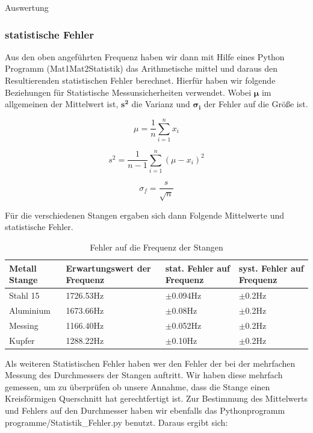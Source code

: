 \documentclass[twoside]{protokoll}
\begin{document}
\begin{aufgabe}{Auswertung}
\subsubsection{statistische Fehler} 

Aus den oben angeführten Frequenz haben wir dann mit Hilfe eines Python Programm (Mat1Mat2Statistik) das Arithmetische mittel und daraus den Resultierenden statistischen Fehler berechnet. Hierfür haben wir folgende Beziehungen für Statistische Messunsicherheiten verwendet. Wobei $\pmb{\mu}$ im allgemeinen der Mittelwert ist, $\mathbf{s^2}$ die Varianz und $\pmb{\sigma_i}$ der Fehler auf die Größe ist.

\begin{equation}
	\mu = \frac{1}{n}\sum_{i=1}^nx_i
\end{equation}

\begin{equation}
	s^2 = \frac{1}{n-1}\sum_{i=1}^n(\mu-x_i)^2
\end{equation}

\begin{equation}
	\sigma_f = \frac{s}{\sqrt{n}} 
\end{equation}

Für die verschiedenen Stangen ergaben sich dann Folgende Mittelwerte und statistische Fehler.\\


 \begin{table}[H]
        \centering
        \begin{tabularx}{1\textwidth}{X X X X} %
            \toprule
            \textbf{Metall Stange} & \textbf{Erwartungswert der Frequenz} & \textbf{stat. Fehler auf Frequenz} & \textbf{syst. Fehler auf Frequenz} \\
            \midrule
            Stahl 15 & 1726.53Hz & $\pm$0.094Hz & $\pm$0.2Hz\\
            Aluminium & 1673.66Hz & $\pm$0.08Hz & $\pm$0.2Hz \\
            Messing & 1166.40Hz & $\pm$0.052Hz & $\pm$0.2Hz \\
            Kupfer & 1288.22Hz & $\pm$0.10Hz & $\pm$0.2Hz \\
            \bottomrule
        \end{tabularx}
        \caption{Fehler auf die Frequenz der Stangen}
        \label{tab:mytable}
    \end{table}
    
Als weiteren Statistischen Fehler haben wer den Fehler der bei der mehrfachen Messung des Durchmessers der Stangen auftritt.
Wir haben diese mehrfach gemessen, um zu überprüfen ob unsere Annahme, dass die Stange einen 
Kreisförmigen Querschnitt hat gerechtfertigt ist. Zur Bestimmung des Mittelwerts und Fehlers auf den Durchmesser 
haben wir ebenfalls das Pythonprogramm programme/Statistik\_Fehler.py benutzt. 
Daraus ergibt sich:\\


\end{aufgabe}
\end{document}
